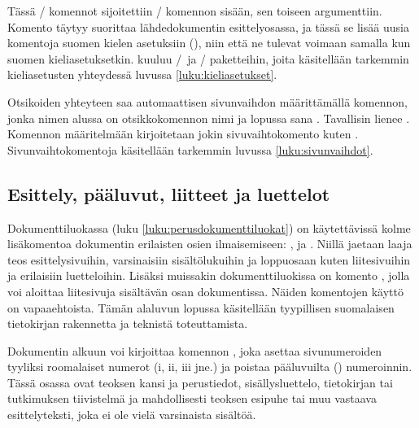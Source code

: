 Tässä \-/ komennot sijoitettiin \-/
komennon sisään, sen toiseen argumenttiin. Komento 
täytyy suorittaa lähdedokumentin esittelyosassa, ja tässä se lisää uusia
komentoja suomen kielen asetuksiin (), niin
että ne tulevat voimaan samalla kun suomen kieliasetuksetkin.
 kuuluu \-/\ ja \-/
paketteihin, joita käsitellään tarkemmin kieliasetusten yhteydessä
luvussa \ref{luku:kieliasetukset}.

Otsikoiden yhteyteen saa automaattisen sivunvaihdon määrittämällä
komennon, jonka nimen alussa on otsikkokomennon nimi ja lopussa sana
. Tavallisin lienee . Komennon
määritelmään kirjoitetaan jokin sivuvaihtokomento kuten
. Sivunvaihtokomentoja käsitellään tarkemmin luvussa
\ref{luku:sivunvaihdot}.

\begin{koodilohkosis}
\newcommand{\sectionbreak}{\clearpage}
\end{koodilohkosis}

\subsection{Esittely, pääluvut, liitteet ja luettelot}
\label{luku:frontmainbackmatter}

Dokumenttiluokassa  (luku \ref{luku:perusdokumenttiluokat})
on käytettävissä kolme lisäkomentoa dokumentin erilaisten osien
ilmaisemiseen: ,  ja
. Niillä jaetaan laaja teos esittelysivuihin,
varsinaisiin sisältölukuihin ja loppuosaan kuten liitesivuihin ja
erilaisiin luetteloihin. Lisäksi muissakin dokumenttiluokissa on komento
, jolla voi aloittaa liitesivuja sisältävän osan
dokumentissa. Näiden komentojen käyttö on vapaaehtoista. Tämän alaluvun
lopussa käsitellään tyypillisen suomalaisen tietokirjan rakennetta ja
teknistä toteuttamista.

Dokumentin alkuun voi kirjoittaa komennon , joka
asettaa sivunumeroiden tyyliksi roomalaiset numerot (i, ii, iii jne.) ja
poistaa pääluvuilta () numeroinnin. Tässä osassa ovat
teoksen kansi ja perustiedot, sisällysluettelo, tietokirjan tai
tutkimuksen tiivistelmä ja mahdollisesti teoksen esipuhe tai muu
vastaava esittelyteksti, joka ei ole vielä varsinaista sisältöä.

